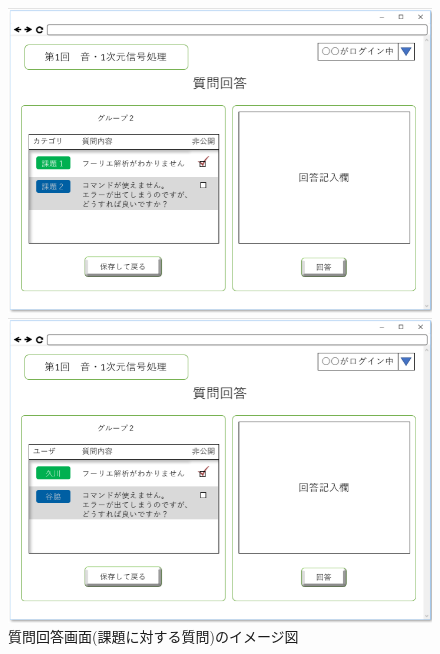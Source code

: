 \begin{figure}[htbp]
 \begin{minipage}{0.5\hsize}
  \begin{center}
   \includegraphics[width=1\linewidth,clip]{./img/24.png}
  \end{center}

 \end{minipage}
 \begin{minipage}{0.5\hsize}
  \begin{center}
   \includegraphics[width=1\linewidth,clip]{./img/25.png}
  \end{center}
 \end{minipage}
 \caption{質問回答画面(課題に対する質問)のイメージ図}\label{fig:24}
\end{figure}

